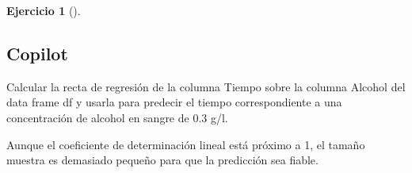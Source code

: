 \documentclass[
  a4paper,
]{scrreport}
\newenvironment{Shaded}{\begin{snugshade}}{\end{snugshade}}
\newcommand{\ExtensionTok}[1]{\textcolor[rgb]{0.00,0.23,0.31}{#1}}
\newcommand{\NormalTok}[1]{\textcolor[rgb]{0.00,0.23,0.31}{#1}}
\theoremstyle{definition}
\newtheorem{exercise}{Ejercicio}[chapter]
\theoremstyle{remark}
\begin{document}
\begin{exercise}[]
\begin{enumerate}
\begin{tcolorbox}
  \section{Copilot}

\begin{Shaded}
\begin{Highlighting}[]
\ExtensionTok{Calcular}\NormalTok{ la recta de regresión de la columna Tiempo sobre la columna Alcohol del data frame df y usarla para predecir el tiempo correspondiente a una concentración de alcohol en sangre de 0.3 g/l.}
\end{Highlighting}
\end{Shaded}

  Aunque el coeficiente de determinación lineal está próximo a 1, el
  tamaño muestra es demasiado pequeño para que la predicción sea fiable.

  \end{tcolorbox}
\end{enumerate}

\end{exercise}
\end{document}
